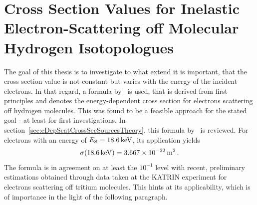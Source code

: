 \section{Cross Section Values for Inelastic Electron-Scattering off Molecular Hydrogen Isotopologues}
\label{sec:eDepScatCrossSecSources}
The goal of this thesis is to investigate to what extend it is important, that the cross section value is not constant but varies with the energy of the incident electrons. In that regard, a formula by~\cite{Liu1987} is used, that is derived from first principles and denotes the energy-dependent cross section for electrons scattering off hydrogen molecules. This was found to be a feasible approach for the stated goal - at least for first investigations. In section~\ref{sec:eDepScatCrossSecSourcesTheory}, this formula by~\cite{Liu1987} is reviewed. For electrons with an energy of $E_\mathrm{S}=\SI{18.6}{keV}$, its application yields 
\begin{equation}
	\label{eq:eDepScatCrossSecSourcesCrossSecLiuAtEndpoint}
	\sigma(\SI{18.6}{keV}) = \SI{3.667e-22}{m^2}
	\text{\,.}
\end{equation}
The formula is in agreement on at least the $10^{-1}$ level with recent, preliminary estimations obtained through data taken at the KATRIN experiment for electrons scattering off tritium molecules. This hints at its applicability, which is of importance in the light of the following paragraph.

